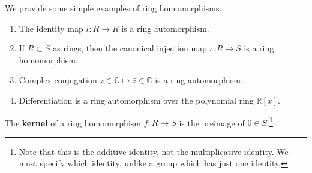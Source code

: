   \begin{example}
    \label{ex:homomorphisms-of-rings}
    We provide some simple examples of ring homomorphisms. 
    \begin{enumerate}
      \item The identity map $\iota : R \to R$ is a ring automorphism. 
      \item If $R \subset S$ as rings, then the canonical injection map $\iota: R \to S$ is a ring homomorphism. 
      \item Complex conjugation $z \in \mathbb{C} \mapsto \bar{z} \in \mathbb{C}$ is a ring automorphism. 
      \item Differentiation is a ring automorphism over the polynomial ring $\mathbb{R}[x]$. 
    \end{enumerate}
  \end{example} 

  \begin{definition}[Kernel]
    \label{def:kernel-2}
    The \textbf{kernel} of a ring homomorphism $f: R \rightarrow S$ is the preimage of $0 \in S$.\footnote{Note that this is the additive identity, not the multiplicative identity. We must specify which identity, unlike a group which has just one identity.}
  \end{definition}

